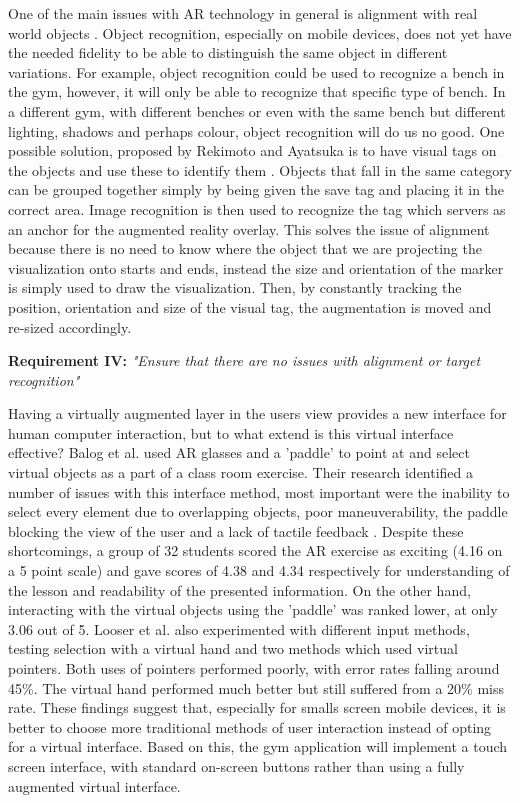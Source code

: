 \documentclass{l4proj}
\begin{document}
One of the main issues with AR technology in general is alignment with real world objects \cite{sood_pro_2012}. Object recognition, especially on mobile devices, does not yet have the needed fidelity to be able to distinguish the same object in different variations. For example, object recognition could be used to recognize a bench in the gym, however, it will only be able to recognize that specific type of bench. In a different gym, with different benches or even with the same bench but different lighting, shadows and perhaps colour, object recognition will do us no good. One possible solution, proposed by Rekimoto and Ayatsuka is to have visual tags on the objects and use these to identify them \cite{rekimoto_cybercode:_2000}. Objects that fall in the same category can be grouped together simply by being given the save tag and placing it in the correct area. Image recognition is then used to recognize the tag which servers as an anchor for the augmented reality overlay. This solves the issue of alignment because there is no need to know where the object that we are projecting the visualization onto starts and ends, instead the size and orientation of the marker is simply used to draw the visualization. Then, by constantly tracking the position, orientation and size of the visual tag, the augmentation is moved and re-sized accordingly.

\textbf{Requirement IV:} \textit{"Ensure that there are no issues with alignment or target recognition"}  \label{requirement_IV}

Having a virtually augmented layer in the users view provides a new interface for human computer interaction, but to what extend is this virtual interface effective? Balog et al. used AR glasses and a 'paddle' to point at and select virtual objects as a part of a class room exercise. Their research identified a number of issues with this interface method, most important were the inability to select every element due to overlapping objects, poor maneuverability, the paddle blocking the view of the user and a lack of tactile feedback \cite{balog_augmented_2007}. Despite these shortcomings, a group of 32 students scored the AR exercise as exciting (4.16 on a 5 point scale) and gave scores of 4.38 and 4.34 respectively for understanding of the lesson and readability of the presented information\cite{looser_evaluation_2007}. On the other hand, interacting with the virtual objects using the 'paddle' was ranked lower, at only 3.06 out of 5\cite{balog_augmented_2007}. Looser et al. also experimented with different input methods, testing selection with a virtual hand and two methods which used virtual pointers\cite{looser_evaluation_2007}. Both uses of pointers performed poorly, with error rates falling around 45\%\cite{looser_evaluation_2007}. The virtual hand performed much better but still suffered from a 20\% miss rate\cite{looser_evaluation_2007}. These findings suggest that, especially for smalls screen mobile devices, it is better to choose  more traditional methods of user interaction instead of opting for a virtual interface. Based on this, the gym application will implement a touch screen interface, with standard on-screen buttons rather than using a fully augmented virtual interface. 
\end{document}
